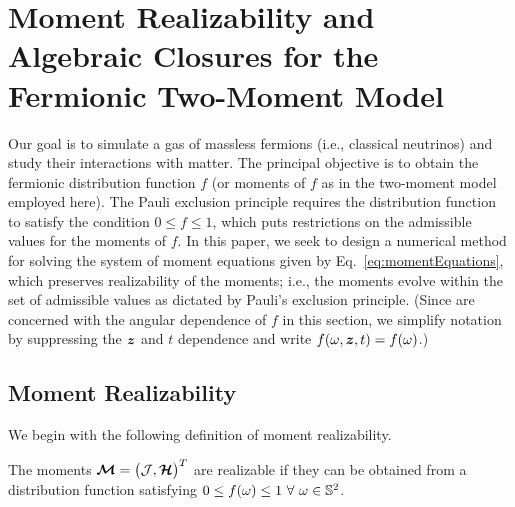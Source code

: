 \section{Moment Realizability and Algebraic Closures for the Fermionic Two-Moment Model}
\label{sec:realizability}

Our goal is to simulate a gas of massless fermions (i.e., classical neutrinos) and study their interactions with matter.  
The principal objective is to obtain the fermionic distribution function $f$ (or moments of $f$ as in the two-moment model employed here).  
The Pauli exclusion principle requires the distribution function to satisfy the condition $0 \le f \le 1$, which puts restrictions on the admissible values for the moments of $f$.  
In this paper, we seek to design a numerical method for solving the system of moment equations given by Eq.~\eqref{eq:momentEquations}, which preserves realizability of the moments; i.e., the moments evolve within the set of admissible values as dictated by Pauli's exclusion principle.  
(Since are concerned with the angular dependence of $f$ in this section, we simplify notation by suppressing the $\boldsymbol{z}$ and $t$ dependence and write $f(\omega,\boldsymbol{z},t)=f(\omega)$.)  

\subsection{Moment Realizability}

We begin with the following definition of moment realizability.  
\begin{define}
  The moments $\boldsymbol{\mathcal{M}}=\big(\mathcal{J},\boldsymbol{\mathcal{H}}\big)^{T}$ are realizable if they can be obtained from a distribution function satisfying $0\le f(\omega) \le 1~\forall~\omega\in\mathbb{S}^{2}$.
\end{define}


